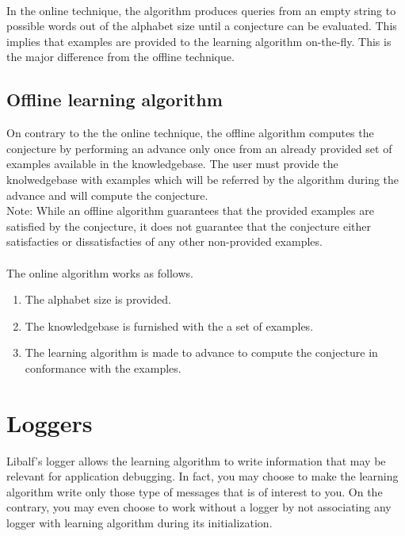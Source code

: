 \paragraph{}
In the online technique, the algorithm produces queries from an empty string to possible words out of the alphabet size until a conjecture can be evaluated. This implies that examples are provided to the learning algorithm on-the-fly. This is the major difference  from the offline technique.


\subsection{Offline learning algorithm}
On contrary to the the online technique, the offline algorithm computes the conjecture by performing an advance only once from an already provided set of examples available in the knowledgebase. The user must provide the knolwedgebase with examples which will be referred by the algorithm during the advance and will compute the conjecture. \\
Note: While an offline algorithm guarantees that the provided examples are satisfied by the conjecture, it does not guarantee that the conjecture either satisfacties or dissatisfacties of any other non-provided examples.
\paragraph{}
The online algorithm works as follows.
\begin{enumerate}
 \item The alphabet size is provided.
 \item The knowledgebase is furnished with the a set of examples.
 \item The learning algorithm is made to advance to compute the conjecture in conformance with the examples.
\end{enumerate}
\paragraph{}

\section{Loggers}
Libalf's logger allows the learning algorithm to write information that may be relevant for application debugging. In fact, you may choose to make the learning algorithm write only those type of messages that is of interest to you. On the contrary, you may even choose to work without a logger by not associating any logger with learning algorithm during its initialization. 
